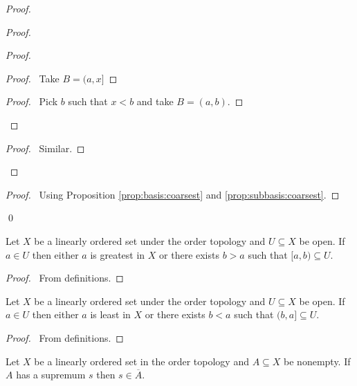 \begin{proof}
\begin{proof}
    \begin{proof}
      \begin{proof}
        \pf\ Take $B = (a, x]$
      \end{proof}
      \begin{proof}
        \pf\ Pick $b$ such that $x < b$ and take $B = (a, b)$.
      \end{proof}
    \end{proof}
    \begin{proof}
      \pf\ Similar.
    \end{proof}
  \end{proof}
  \qedstep
  \begin{proof}
    \pf\ Using Proposition \ref{prop:basis:coarsest} and \ref{prop:subbasis:coarsest}.
  \end{proof}
  \qed
\end{proof}

\begin{prop}
  \label{prop:order:open_up}
  Let $X$ be a linearly ordered set under the order topology and $U \subseteq X$ be open. If $a \in U$ then either $a$ is greatest in $X$ or there exists $b > a$ such that $[a,b) \subseteq U$.
\end{prop}

\begin{proof}
  \pf\ From definitions.
\end{proof}

\begin{prop}
  \label{prop:order:open_down}
  Let $X$ be a linearly ordered set under the order topology and $U \subseteq X$ be open. If $a \in U$ then either $a$ is least in $X$ or there exists $b < a$ such that $(b,a] \subseteq U$.
\end{prop}

\begin{proof}
  \pf\ From definitions.
\end{proof}

\begin{prop}
  \label{prop:order:supremum_closure}
  Let $X$ be a linearly ordered set in the order topology and $A \subseteq X$ be nonempty. If $A$ has a supremum $s$ then $s \in \overline{A}$.
\end{prop}

